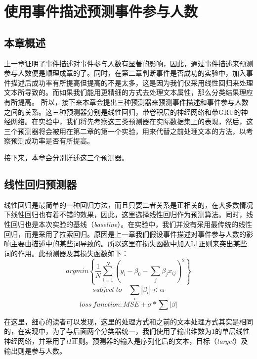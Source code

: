 \documentclass[12pt]{template}
\begin{document}
\section{使用事件描述预测事件参与人数}
\subsection{本章概述}
上一章证明了事件描述对事件参与人数有显著的影响，因此，通过事件描述来预测参与人数便是顺理成章的了。同时，在第二章判断事件是否成功的实验中，加入事件描述后成功率有所提高但提高的不是太多，这是因为我们仅采用线性回归来处理文本所导致的。而如果我们能用更精细的方式去处理文本属性，那么分类结果理应有所提高。 所以，接下来本章会提出三种预测器来预测事件描述和事件参与人数之间的关系。这三种预测器分别是线性回归，带卷积层的神经网络和带GRU的神经网络。在实验中，我们将先考察这三类预测器在实际数据集上的表现，然后，这三个预测器将会被用在第二章的第一个实验，用来代替之前处理文本的方法，以考察预测成功率是否有所提高。

接下来，本章会分别详述这三个预测器。

\subsection{线性回归预测器}
线性回归是最简单的一种回归方法，而且只要二者关系是正相关的，在大多数情况下线性回归也有着不错的效果，因此，这里选择线性回归作为预测算法。同时，线性回归也是本次实验的基线（\textit{baseline}）。在实验中，我们并没有采用最传统的线性回归，而是采用了拉索回归。原因是上一章我们假设事件描述对事件参与人数的影响主要由描述中的某些词导致的。所以这里在损失函数中加入L1正则来突出某些词的作用。此预测器及其损失函数如下：
\begin{equation}
argmin\left\{\frac{1}{N}\displaystyle\sum_{i=1}^{N}
(y_i-\beta_0-\displaystyle\sum_{j}\beta_jx_{ij})^2\right\}
\end{equation}
\begin{equation}
subject\ to \quad \displaystyle\sum_{i}|\beta_i|<\alpha
\end{equation}
\begin{equation}
loss\ function: MSE+\sigma*\sum|\beta|
\end{equation}

在这里，细心的读者可以发现，这里的处理方式和之前的文本处理方式其实是相同的，在实现中，为了与后面两个分类器统一，我们使用了输出维数为1的单层线性神经网络，并采用了\textit{l1}正则。预测器的输入是序列化后的文本，目标（\textit{target}）及输出则是参与人数。
\end{document}

